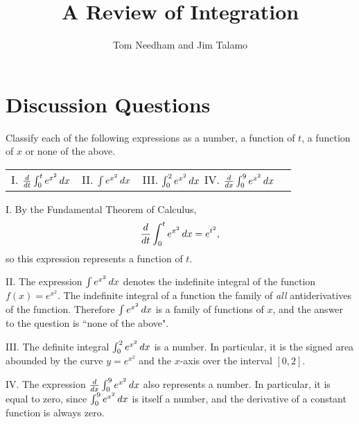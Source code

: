 \documentclass[]{ximera}
\author{Tom Needham and Jim Talamo}
\title[]{A Review of Integration}
\begin{document}
\begin{abstract}
\end{abstract}
\maketitle

\vspace{-0.9in}

\section{Discussion Questions}

\begin{problem}
Classify each of the following expressions as a number, a function of $t$, a function of $x$ or none of the above.


\begin{tabular}{llll}
I. $\frac{\mathop{}\!d}{\mathop{}\!d t} \int_0^t e^{x^2} \mathop{}\!d x$ \hspace{0.2in} & II. $\int e^{x^2} \mathop{}\!d x$ \hspace{0.2in} & III. $\int_0^2 e^{x^2} \mathop{}\!d x$ \hspace{0.2in}
IV. $\frac{d}{dx} \int_0^9 e^{x^2} \mathop{}\!d x$
\end{tabular}

\end{problem}

\begin{freeResponse}
 I. By the Fundamental Theorem of Calculus, 
$$
\frac{\mathop{}\!d}{\mathop{}\!d t} \int_0^t e^{x^2} \mathop{}\!d x = e^{t^2},
$$
so this expression represents a function of $t$.

II. The expression $\int e^{x^2} \mathop{}\!d x$ denotes the indefinite integral of the function $f(x)=e^{x^2}$. The indefinite integral of a function the family of \textit{all} antiderivatives of the function. Therefore $\int e^{x^2} \mathop{}\!d x$ is a family of functions of $x$, and the answer to the question is ``none of the above".

III. The definite integral $\int_0^2 e^{x^2} \mathop{}\!d x$ is a number. In particular, it is the signed area abounded by the curve $y=e^{x^2}$ and the $x$-axis over the interval $[0,2]$. 

IV. The expression $\frac{d}{dx} \int_0^9 e^{x^2} \mathop{}\!d x$ also represents a number. In particular, it is equal to zero, since $\int_0^9 e^{x^2} \mathop{}\!d x$ is itself a number, and the derivative of a constant function is always zero.
\end{freeResponse}
\end{document}
